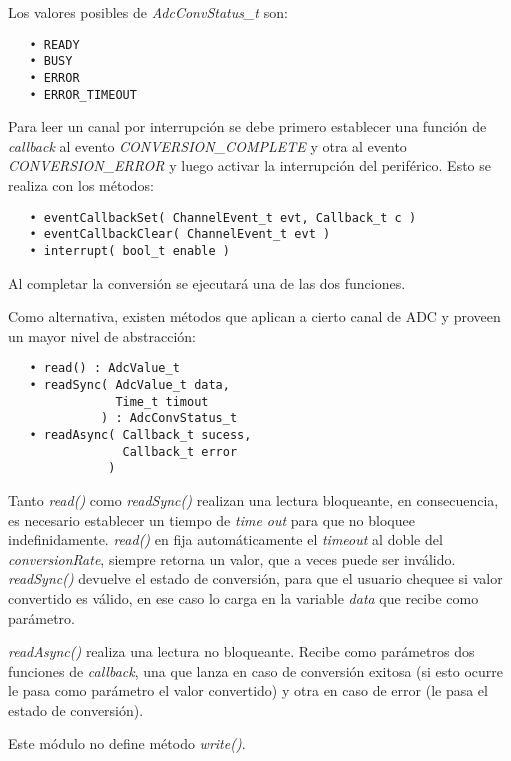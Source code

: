 Los valores posibles de \emph{AdcConvStatus\_t} son: 


\begin{verbatim}
   • READY
   • BUSY
   • ERROR
   • ERROR_TIMEOUT
\end{verbatim}

Para leer un canal por interrupción se debe primero establecer una función de \emph{callback} al evento \emph{CONVERSION\_COMPLETE} y otra al evento  \emph{CONVERSION\_ERROR} y luego activar la interrupción del periférico. Esto se realiza con los métodos:

\begin{verbatim}
   • eventCallbackSet( ChannelEvent_t evt, Callback_t c )
   • eventCallbackClear( ChannelEvent_t evt )
   • interrupt( bool_t enable )
\end{verbatim}

Al completar la conversión se ejecutará una de las dos funciones.


Como alternativa, existen métodos que aplican a cierto canal de ADC y proveen un mayor nivel de abstracción:

\begin{verbatim}
   • read() : AdcValue_t
   • readSync( AdcValue_t data, 
               Time_t timout 
             ) : AdcConvStatus_t
   • readAsync( Callback_t sucess, 
                Callback_t error 
              )
\end{verbatim}

Tanto \emph{read()} como \emph{readSync()} realizan una lectura bloqueante, en consecuencia, es necesario establecer un tiempo de \textit{time out} para que no bloquee indefinidamente. \emph{read()} en fija automáticamente el \emph{timeout} al doble del \emph{conversionRate}, siempre retorna un valor, que a veces puede ser inválido. \emph{readSync()} devuelve el estado de conversión, para que el usuario chequee si valor convertido es válido, en ese caso lo carga en la variable \emph{data} que recibe como parámetro.

\emph{readAsync()} realiza una lectura no bloqueante. Recibe como parámetros dos funciones de \emph{callback}, una que lanza en caso de conversión exitosa (si esto ocurre le pasa como parámetro el valor convertido) y otra en caso de error (le pasa el estado de conversión).

Este módulo no define método \emph{write()}.

